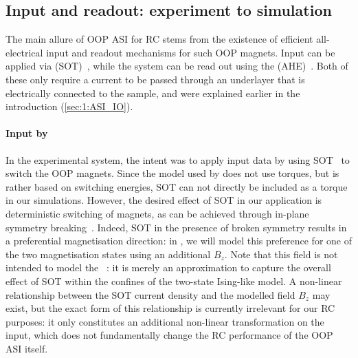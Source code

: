 \subsection{Input and readout: experiment to simulation}\label{sec:3:IO_exp_to_sim}
The main allure of OOP ASI for RC stems from the existence of efficient all-electrical input and readout mechanisms for such OOP magnets.
Input can be applied via  (SOT)~\cite{SOT_FM_AFM,SOTswitchingCoPt}, while the system can be read out using the  (AHE)~\cite{AHE}.
Both of these only require a current to be passed through an underlayer that is electrically connected to the sample, and were explained earlier in the introduction (\cref{sec:1:ASI_IO}).

\paragraph{Input by }
In the experimental system, the intent was to apply input data by using SOT~\cite{SOTswitchingCoPt} to switch the OOP magnets.
Since the model used by \hotspice does not use torques, but is rather based on switching energies, SOT can not directly be included as a torque in our simulations.
However, the desired effect of SOT in our application is deterministic switching of magnets, as can be achieved through in-plane symmetry breaking~\cite{SOT_Roadmap}. %
Indeed, SOT in the presence of broken symmetry results in a preferential magnetisation direction: in \hotspice, we will model this preference for one of the two magnetisation states using an additional  $B_z$.
Note that this field is not intended to model the ~\cite{SOT_firstprinciplesCoPt}: it is merely an approximation to capture the overall effect of SOT within the confines of the two-state Ising-like model.
A non-linear relationship between the SOT current density and the modelled field $B_z$ may exist, but the exact form of this relationship is currently irrelevant for our RC purposes: it only constitutes an additional non-linear transformation on the input, which does not fundamentally change the RC performance of the OOP ASI itself.

